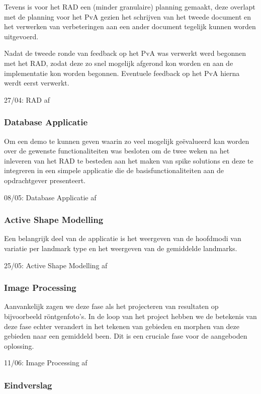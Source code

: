 Tevens is voor het RAD een (minder granulaire) planning gemaakt, deze overlapt
met de planning voor het PvA gezien het schrijven van het tweede document en
het verwerken van verbeteringen aan een ander document tegelijk kunnen worden
uitgevoerd.

Nadat de tweede ronde van feedback op het PvA was verwerkt werd begonnen met
het RAD, zodat deze zo snel mogelijk afgerond kon worden en aan de
implementatie kon worden begonnen. Eventuele feedback op het PvA hierna werdt
eerst verwerkt.

27/04: RAD af

\subsubsection{Database Applicatie}

Om een demo te kunnen geven waarin zo veel mogelijk ge\"{e}valueerd kan worden
over de gewenste functionaliteiten was besloten om de twee weken na het
inleveren van het RAD te besteden aan het maken van spike solutions en deze te
integreren in een simpele applicatie die de basisfunctionaliteiten aan de
opdrachtgever presenteert.

08/05: Database Applicatie af

\subsubsection{Active Shape Modelling}

Een belangrijk deel van de applicatie is het weergeven van de hoofdmodi van
variatie per landmark type en het weergeven van de gemiddelde landmarks.

25/05: Active Shape Modelling af

\subsubsection{Image Processing}

Aanvankelijk zagen we deze fase als het projecteren van resultaten op
bijvoorbeeld r\"{o}ntgenfoto's. In de loop van het project hebben we de
betekenis van deze fase echter verandert in het tekenen van gebieden en
morphen van deze gebieden naar een gemiddeld been. Dit is een cruciale fase
voor de aangeboden oplossing.

11/06: Image Processing af

\subsubsection{Eindverslag}

